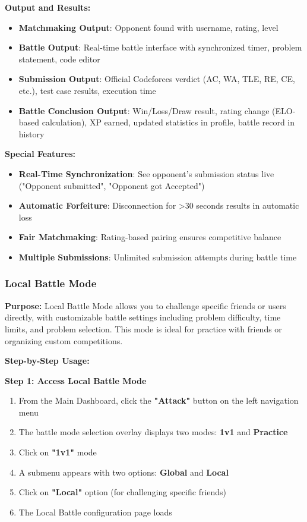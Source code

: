 \documentclass[12pt,a4paper]{article}
\begin{document}
\textbf{Output and Results:}
\begin{itemize}[leftmargin=1.8em]
\item \textbf{Matchmaking Output}: Opponent found with username, rating, level
\item \textbf{Battle Output}: Real-time battle interface with synchronized timer, problem statement, code editor
\item \textbf{Submission Output}: Official Codeforces verdict (AC, WA, TLE, RE, CE, etc.), test case results, execution time
\item \textbf{Battle Conclusion Output}: Win/Loss/Draw result, rating change (ELO-based calculation), XP earned, updated statistics in profile, battle record in history
\end{itemize}

\textbf{Special Features:}
\begin{itemize}[leftmargin=1.8em]
\item \textbf{Real-Time Synchronization}: See opponent's submission status live ("Opponent submitted", "Opponent got Accepted")
\item \textbf{Automatic Forfeiture}: Disconnection for >30 seconds results in automatic loss
\item \textbf{Fair Matchmaking}: Rating-based pairing ensures competitive balance
\item \textbf{Multiple Submissions}: Unlimited submission attempts during battle time
\end{itemize}

\FloatBarrier

\subsubsection{Local Battle Mode}

\textbf{Purpose:} Local Battle Mode allows you to challenge specific friends or users directly, with customizable battle settings including problem difficulty, time limits, and problem selection. This mode is ideal for practice with friends or organizing custom competitions.

\textbf{Step-by-Step Usage:}

\textbf{Step 1: Access Local Battle Mode}
\begin{enumerate}
\item From the Main Dashboard, click the \textbf{"Attack"} button on the left navigation menu
\item The battle mode selection overlay displays two modes: \textbf{1v1} and \textbf{Practice}
\item Click on \textbf{"1v1"} mode
\item A submenu appears with two options: \textbf{Global} and \textbf{Local}
\item Click on \textbf{"Local"} option (for challenging specific friends)
\item The Local Battle configuration page loads
\end{enumerate}
\end{document}

